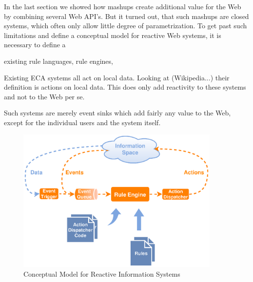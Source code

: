 





In the last section we showed how mashups create additional value for the Web by combining several Web API's.
But it turned out, that such mashups are closed systems, which often only allow little degree of parametrization.
To get past such limitations and define a conceptual model for reactive Web systems, it is necessary to define a 

existing rule languages, rule engines, 

Existing ECA systems all act on local data.
Looking at (Wikipedia...) their definition is actions on local data.
This does only add reactivity to these systems and not to the Web per se.

Such systems are merely event sinks which add fairly any value to the Web, except for the individual users and the system itself.

\begin{figure}[!ht]
  \centering
  \includegraphics[width=0.9\textwidth]{figures/Standard-Model-Template}
  \caption{Conceptual Model for Reactive Information Systems}
  \label{fig:Standard-Model-Template}
\end{figure}



